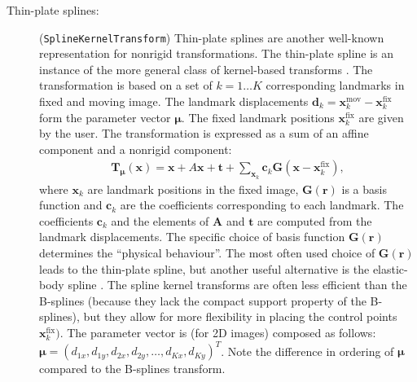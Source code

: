 \documentclass[]{report}
\newcommand{\vx}{\bm{x}}
\newcommand{\vmu}{\bm{\mu}}
\newcommand{\vTmx}{\bm{T}_{\vmu}(\bm{x})}
\begin{document}
\begin{description}
\item[Thin-plate splines:] (\texttt{SplineKernelTransform}) Thin-plate
    splines are another well-known representation for nonrigid
    transformations. The thin-plate spline is an instance of the more
    general class of kernel-based transforms \cite{Davis97,Brooks07}. The
    transformation is based on a set of $k=1\ldots K$ corresponding
    landmarks in fixed and moving image. The landmark displacements
    $\bm{d}_k = \vx_k^{\mathrm{mov}} - \vx_k^{\mathrm{fix}}$ form the
    parameter vector $\vmu$. The fixed landmark positions
    $\vx_k^{\mathrm{fix}}$ are given by the user. The transformation is
    expressed as a sum of an affine component and a nonrigid component:
\begin{align}
\vTmx = \vx + A \vx + \bm{t} + \sum_{\vx_k} \bm{c}_k \bm{G}(\vx
- \vx_k^{\mathrm{fix}}),\label{eq:splinekernel}
\end{align}
 where $\vx_k$ are landmark positions in the fixed image, $\bm{G}(\bm{r})$
 is a basis function and $\bm{c}_k$ are the coefficients corresponding to
 each landmark. The coefficients $\bm{c}_k$ and the elements of $\bm{A}$
 and $\bm{t}$ are computed from the landmark displacements. The specific
 choice of basis function $\bm{G}(\bm{r})$ determines the ``physical
 behaviour''. The most often used choice of $\bm{G}(\bm{r})$ leads to the
 thin-plate spline, but another useful alternative is the elastic-body
 spline \cite{Davis97}. The spline kernel transforms are often less
 efficient than the B-splines (because they lack the compact support
 property of the B-splines), but they allow for more flexibility in placing
 the control points $\vx_k^{\mathrm{fix}})$. The parameter vector is (for
 2D images) composed as follows: $\vmu = (d_{1x}, d_{1y}, d_{2x}, d_{2y},
 \ldots, d_{Kx}, d_{Ky} )^T$. Note the difference in ordering of $\vmu$
 compared to the B-splines transform.
\end{description}
\end{document}
